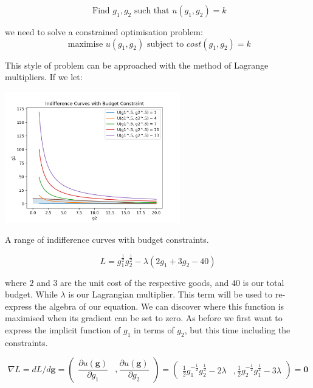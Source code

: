 \documentclass{tufte-handout}
\begin{document}
$$ \text{ Find } g_{1}, g_{2} \text{ such that } u(g_{1}, g_{2}) = k $$

\noindent we need to solve a constrained optimisation problem: 
$$ \text{ maximise } u(g_{1}, g_{2})  \text{ subject to } cost(g_{1}, g_{2}) =  k$$

\noindent This style of problem can be approached with the method of Lagrange multipliers. If we let:

\begin{marginfigure}
\includegraphics[width=3in, height=5.in]{Plots/indifference_curves_budget.png}
\caption{A range of indifference curves with budget constraints.}
\end{marginfigure}

$$ L = g_{1}^{\frac{1}{2}}g_{2}^{\frac{1}{2}} - \lambda(2g_{1} + 3g_{2} - 40) $$

\noindent where $2$ and $3$ are the unit cost of the respective goods, and $40$ is our total budget. While $\lambda$ is our Lagrangian multiplier. This term will be used to re-express the algebra of our equation. We can discover where this function is maximised when its gradient can be set to zero. As before we first want to express the implicit function of $g_{1}$ in terms of $g_{2}$, but this time including the constraints.


\[
\nabla L = dL /  d\mathbf{g} =
    \begin{pmatrix}
       \dfrac{\partial u(\mathbf{g})}{\partial g_1}   & , \dfrac{\partial u(\mathbf{g})}{\partial g_2}
    \end{pmatrix} = \begin{pmatrix}
    \frac{1}{2}g_{1}^{-\frac{1}{2}}g_{2}^{\frac{1}{2} } - 2\lambda & ,
    \frac{1}{2}g_{2}^{-\frac{1}{2}}g_{1}^{\frac{1}{2} } - 3\lambda
    \end{pmatrix} = \mathbf{0}
  \]
\end{document}
